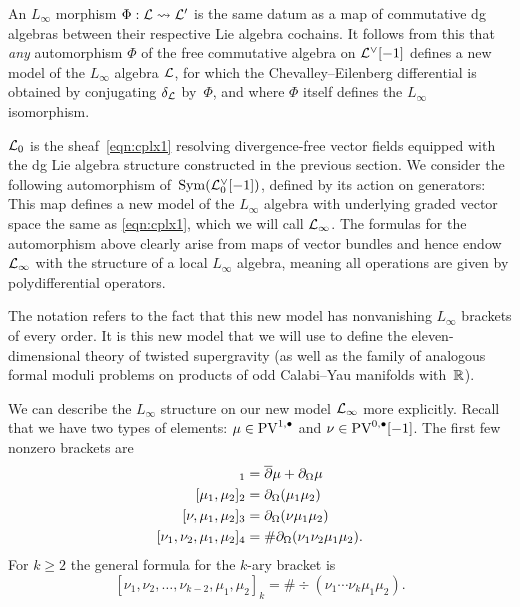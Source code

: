 \documentclass[11pt]{amsart}
\begin{document}
An $L_\infty$ morphism $\Phi: \mathcal L \rightsquigarrow \mathcal L'$ is the same datum as a map of commutative dg algebras 
between their respective Lie algebra cochains. It follows from this that \emph{any} automorphism $\Phi$ of the free commutative algebra on $\mathcal L^\vee[-1]$ defines a new model of the $L_\infty$ algebra $\mathcal L$, for which the Chevalley--Eilenberg differential is obtained by conjugating $\delta_\mathcal L$ by~$\Phi$, and where $\Phi$ itself defines the $L_\infty$ isomorphism.

$\mathcal L_0$ is the sheaf~\eqref{eqn:cplx1} resolving divergence-free vector fields equipped with the dg Lie algebra structure constructed in the previous section.
We consider the following automorphism of~$\operatorname{Sym}(\mathcal L_0^\vee[-1])$, defined by its action on generators:
This map defines a new model of the $L_\infty$ algebra with underlying graded vector space the same as \eqref{eqn:cplx1}, which we will call $\mathcal L_\infty$. 
The formulas for the automorphism above clearly arise from maps of vector bundles and hence endow $\mathcal L_\infty$ with the structure of a local $L_\infty$ algebra, meaning all operations are given by polydifferential operators.  

The notation refers to the fact that this new model has nonvanishing $L_\infty$ brackets of every order. 
It is this new model that we will use to define the eleven-dimensional theory of twisted supergravity (as well as the family of analogous formal moduli problems on products of odd Calabi--Yau manifolds with~$\mathbb{R}$). 



We can describe the $L_\infty$ structure on our new model $\mathcal L_\infty$ more explicitly.
Recall that we have two types of elements: $\mu \in {\rm PV}^{1,\bullet}$ and $\nu \in {\rm PV}^{0,\bullet}[-1]$. 
The first few nonzero brackets are
\begin{align*}
[\mu]_1 & = \dbar \mu + \div \mu \\
[\mu_1,\mu_2]_2 & = \div (\mu_1 \mu_2) \\
[\nu, \mu_1,\mu_2]_3 & = \div(\nu \mu_1 \mu_2) \\
[\nu_1,\nu_2, \mu_1,\mu_2]_4 & = \# \div(\nu_1 \nu_2 \mu_1 \mu_2).
\end{align*}
For $k \geq 2$ the general formula for the $k$-ary bracket is 
\[
[\nu_1,\nu_2, \ldots, \nu_{k-2}, \mu_1,\mu_2]_{k} = \# \div(\nu_1 \cdots \nu_k \mu_1 \mu_2) .
\]
\end{document}
